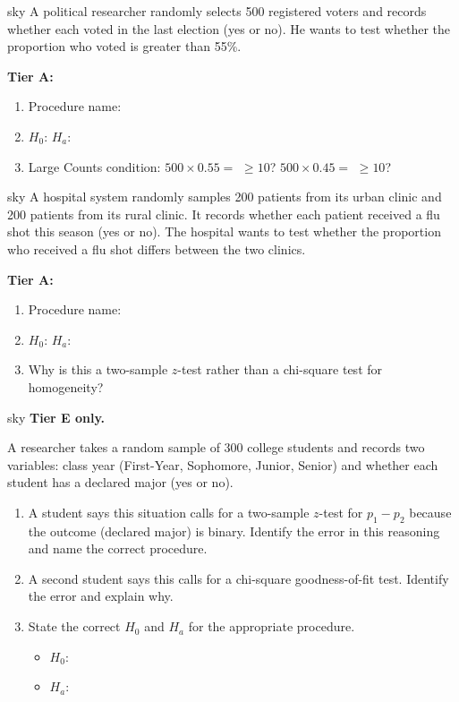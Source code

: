 \documentclass[10pt]{article}
\begin{document}
\begin{scenariobox}{sky}
A political researcher randomly selects 500 registered voters and records whether each voted
in the last election (yes or no). He wants to test whether the proportion who voted is
greater than 55\%.

\textbf{Tier A:}
\begin{enumerate}
  \item Procedure name: \blank{8cm}
  \item $H_0$: \blank{5cm} \quad $H_a$: \blank{5cm}
  \item Large Counts condition: $500 \times 0.55 =$ \blank{2cm} $\ge 10$? \blank{1.5cm} \quad
        $500 \times 0.45 =$ \blank{2cm} $\ge 10$? \blank{1.5cm}
\end{enumerate}
\end{scenariobox}

\begin{scenariobox}{sky}
A hospital system randomly samples 200 patients from its urban clinic and 200 patients from
its rural clinic. It records whether each patient received a flu shot this season (yes or no).
The hospital wants to test whether the proportion who received a flu shot differs between the
two clinics.

\textbf{Tier A:}
\begin{enumerate}
  \item Procedure name: \blank{8cm}
  \item $H_0$: \blank{5cm} \quad $H_a$: \blank{5cm}
  \item Why is this a two-sample $z$-test rather than a chi-square test for homogeneity?
        \writeline \writeline
\end{enumerate}
\end{scenariobox}

\begin{scenariobox}{sky}
\textbf{Tier E only.}

A researcher takes a random sample of 300 college students and records two variables: class
year (First-Year, Sophomore, Junior, Senior) and whether each student has a declared major
(yes or no).

\begin{enumerate}
  \item A student says this situation calls for a two-sample $z$-test for $p_1 - p_2$
        because the outcome (declared major) is binary. Identify the error in this reasoning
        and name the correct procedure.
        \writeline \writeline \writeline
  \item A second student says this calls for a chi-square goodness-of-fit test. Identify the
        error and explain why.
        \writeline \writeline \writeline
  \item State the correct $H_0$ and $H_a$ for the appropriate procedure.
        \begin{itemize}
          \item $H_0$: \writeline
          \item $H_a$: \writeline
        \end{itemize}
\end{enumerate}
\end{scenariobox}
\end{document}
